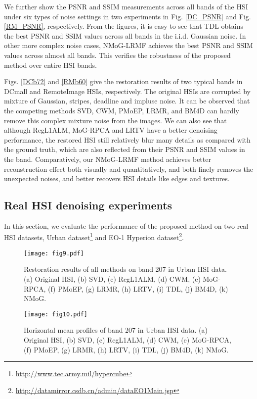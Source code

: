 \documentclass[journal]{IEEEtran}
\begin{document}
We further show the PSNR and SSIM measurements across all bands of the HSI under six types of noise settings in two experiments in Fig. \ref{DC_PSNR} and Fig. \ref{RM_PSNR}, respectively. From the figures,  it is easy to see that TDL obtains  the best PSNR and SSIM values across all bands in the i.i.d. Gaussian noise.
In other more complex noise cases, NMoG-LRMF achieves the best PSNR and SSIM values across almost all bands. This verifies the robustness of the proposed method over entire HSI bands.

Figs. \ref{DCb72} and \ref{RMb60} give the restoration results of two typical bands in DCmall and RemoteImage HSIs, respectively. The original HSIs are corrupted by mixture of Gaussian, stripes, deadline and impluse noise. It can be observed that the competing methods SVD, CWM, PMoEP, LRMR, and BM4D can hardly remove this complex mixture noise from the images. We can also see that although RegL1ALM, MoG-RPCA and LRTV have a better denoising performance, the restored HSI still relatively blur many details as compared with the ground truth, which are also reflected from their PSNR and SSIM values in the band.
Comparatively, our NMoG-LRMF method achieves better reconstruction effect both visually and quantitatively, and both finely removes the unexpected noises, and better recovers HSI details like edges and textures.


\subsection{Real HSI denoising experiments}
In this section, we evaluate the performance of the proposed method on two real HSI datasets, Urban dataset\footnote{\url{http://www.tec.army.mil/hypercube} } and EO-1 Hyperion dataset\footnote{\url{http://datamirror.csdb.cn/admin/dataEO1Main.jsp}}.

\begin{figure*}
	\centering
	\texttt{[image: fig9.pdf]}\vspace{-3mm}
	\caption{Restoration results of all methods on band 207 in Urban HSI data.(a) Original HSI, (b) SVD, (c) RegL1ALM, (d) CWM, (e) MoG-RPCA,  (f) PMoEP, (g) LRMR, (h) LRTV, (i) TDL, (j) BM4D, (k) NMoG.  \label{urban207} }
\end{figure*}

\begin{figure*}
	\centering
	\texttt{[image: fig10.pdf]}\vspace{-3mm}
	\caption{Horizontal mean profiles of band 207 in Urban HSI data. (a) Original HSI, (b) SVD, (c) RegL1ALM, (d) CWM, (e) MoG-RPCA,  (f) PMoEP, (g) LRMR, (h) LRTV, (i) TDL, (j) BM4D, (k) NMoG. \label{urbanhor} }
\end{figure*}
\end{document}
